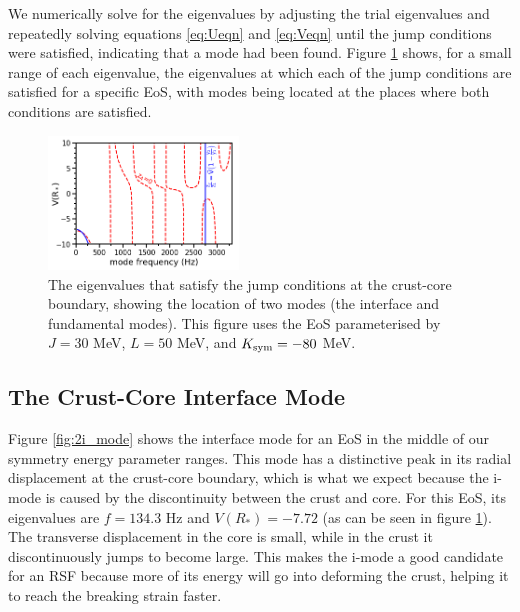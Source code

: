 \documentclass[fleqn,usenatbib]{mnras}
\begin{document}
We numerically solve for the eigenvalues by adjusting the trial eigenvalues and repeatedly solving equations \ref{eq:Ueqn} and \ref{eq:Veqn} until the jump conditions were satisfied, indicating that a mode had been found. Figure \ref{fig:trace_minima} shows, for a small range of each eigenvalue, the eigenvalues at which each of the jump conditions are satisfied for a specific EoS, with modes being located at the places where both conditions are satisfied.
\begin{figure}
\centering
\includegraphics[width=0.45\textwidth,angle=0]{minima_30_50_-80.png}
\caption{The eigenvalues that satisfy the jump conditions at the crust-core boundary, showing the location of two modes (the interface and fundamental modes). This figure uses the EoS parameterised by $J=30$ MeV, $L=50$ MeV, and $K_{\rm sym}=-80$ MeV.}
\label{fig:trace_minima}
\end{figure}








\subsection{The Crust-Core Interface Mode}
\hspace{\parindent}Figure \ref{fig:2i_mode} shows the interface mode for an EoS in the middle of our symmetry energy parameter ranges. This mode has a distinctive peak in its radial displacement at the crust-core boundary, which is what we expect because the i-mode is caused by the discontinuity between the crust and core. For this EoS, its eigenvalues are $f=134.3$ Hz and $V(R_*)=-7.72$ (as can be seen in figure \ref{fig:trace_minima}). The transverse displacement in the core is small, while in the crust it discontinuously jumps to become large. This makes the i-mode a good candidate for an RSF because more of its energy will go into deforming the crust, helping it to reach the breaking strain faster.
\end{document}
